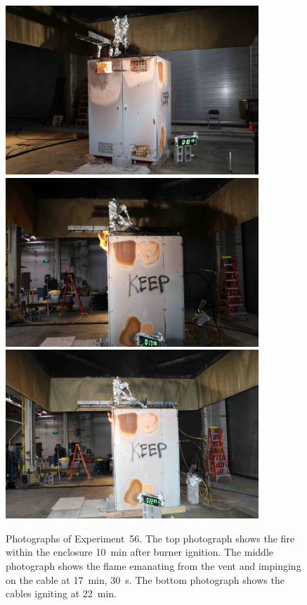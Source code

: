 \begin{figure}[p]
\centering
\includegraphics[height=2.50in]{../FIGURES/Test_56_10_min_13_s} \\ \vspace{0.1in}
\includegraphics[height=2.50in]{../FIGURES/Test_56_17_min_30_s} \\ \vspace{0.1in}
\includegraphics[height=2.50in]{../FIGURES/Test_56_22_min_5_s}
\caption[Photographs of Experiment~56]{Photographs of Experiment~56. The top photograph shows the fire within the enclosure 10~min after burner ignition. The middle photograph shows the flame emanating from the vent and impinging on the cable at 17~min, 30~s. The bottom photograph shows the cables igniting at 22~min.}
\label{fig:Test_56_photos}
\end{figure}



